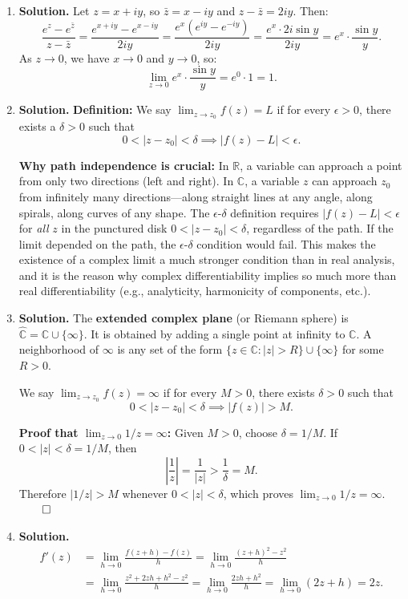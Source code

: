 \begin{enumerate}
\item \textbf{Solution.}
Let $z = x + iy$, so $\bar{z} = x - iy$ and $z - \bar{z} = 2iy$. Then:
\[
\frac{e^z - e^{\bar{z}}}{z - \bar{z}} = \frac{e^{x+iy} - e^{x - iy}}{2iy} = \frac{e^x(e^{iy} - e^{-iy})}{2iy} = \frac{e^x \cdot 2i\sin y}{2iy} = e^x \cdot \frac{\sin y}{y}.
\]
As $z \to 0$, we have $x \to 0$ and $y \to 0$, so:
\[
\lim_{z \to 0} e^x \cdot \frac{\sin y}{y} = e^0 \cdot 1 = 1.
\]

\item \textbf{Solution.}
\textbf{Definition:} We say $\displaystyle\lim_{z \to z_0} f(z) = L$ if for every $\epsilon > 0$, there exists a $\delta > 0$ such that
\[
0 < |z - z_0| < \delta \implies |f(z) - L| < \epsilon.
\]

\textbf{Why path independence is crucial:} In $\mathbb{R}$, a variable can approach a point from only two directions (left and right). In $\mathbb{C}$, a variable $z$ can approach $z_0$ from infinitely many directions---along straight lines at any angle, along spirals, along curves of any shape. The $\epsilon$-$\delta$ definition requires $|f(z) - L| < \epsilon$ for \emph{all} $z$ in the punctured disk $0 < |z - z_0| < \delta$, regardless of the path. If the limit depended on the path, the $\epsilon$-$\delta$ condition would fail. This makes the existence of a complex limit a much stronger condition than in real analysis, and it is the reason why complex differentiability implies so much more than real differentiability (e.g., analyticity, harmonicity of components, etc.).

\item \textbf{Solution.}
The \textbf{extended complex plane} (or Riemann sphere) is $\hat{\mathbb{C}} = \mathbb{C} \cup \{\infty\}$. It is obtained by adding a single point at infinity to $\mathbb{C}$. A neighborhood of $\infty$ is any set of the form $\{z \in \mathbb{C} : |z| > R\} \cup \{\infty\}$ for some $R > 0$.

We say $\displaystyle\lim_{z \to z_0} f(z) = \infty$ if for every $M > 0$, there exists $\delta > 0$ such that
\[
0 < |z - z_0| < \delta \implies |f(z)| > M.
\]

\textbf{Proof that $\lim_{z \to 0} 1/z = \infty$:} Given $M > 0$, choose $\delta = 1/M$. If $0 < |z| < \delta = 1/M$, then
\[
\left|\frac{1}{z}\right| = \frac{1}{|z|} > \frac{1}{\delta} = M.
\]
Therefore $|1/z| > M$ whenever $0 < |z| < \delta$, which proves $\lim_{z \to 0} 1/z = \infty$. $\qed$

\item \textbf{Solution.}
\begin{align*}
f'(z) &= \lim_{h \to 0} \frac{f(z+h) - f(z)}{h} = \lim_{h \to 0} \frac{(z+h)^2 - z^2}{h} \\
&= \lim_{h \to 0} \frac{z^2 + 2zh + h^2 - z^2}{h} = \lim_{h \to 0} \frac{2zh + h^2}{h} = \lim_{h \to 0} (2z + h) = 2z.
\end{align*}


\end{enumerate}

